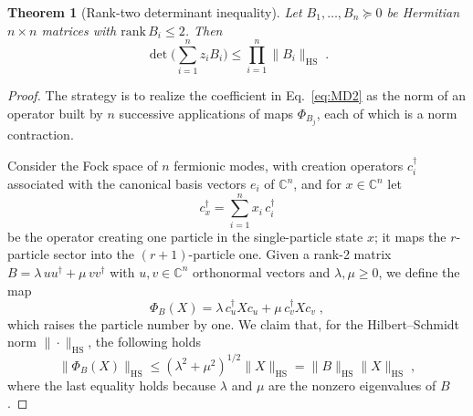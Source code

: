 \documentclass[prx,twocolumn,superscriptaddress,aps,10pt, frontmatterverbose, reprint,footinbib,longbibliography=true]{revtex4-2}
\newtheorem{theorem}{Theorem}
\begin{document}
\begin{theorem}[Rank-two determinant inequality]
\label{thm:MD2}
Let $B_1,\dots,B_n\succeq0$ be Hermitian $n\times n$ matrices with $\mathrm{rank}\,B_i\le2$. Then
\begin{equation}
    [z_1\cdots z_n]\det\!\Big(\sum_{i=1}^nz_iB_i\Big)\le\prod_{i=1}^n\|B_i\|_{\mathrm{HS}}\;.
    \label{eq:MD2}
\end{equation}
\end{theorem}

\begin{proof}
The strategy is to realize the coefficient in Eq.~\eqref{eq:MD2} as the norm of an operator built by $n$ successive applications of maps $\Phi_{B_j}$, each of which is a norm contraction.

Consider the Fock space of $n$ fermionic modes, with creation operators $c_i^\dagger$ associated with the canonical basis vectors $e_i$ of $\mathbb{C}^n$, and for $x\in\mathbb{C}^n$ let
\begin{equation}
  c_x^\dagger=\sum_{i=1}^n x_i\,c_i^\dagger
\end{equation} 
be the operator creating one particle in the single-particle state $x$; it maps the $r$-particle sector into the $(r+1)$-particle one. Given a rank-2 matrix $B=\lambda\,uu^\dagger+\mu\,vv^\dagger$ with $u,v \in \mathbb{C}^n$ orthonormal vectors and $\lambda,\mu\ge0$, we define the map
\begin{equation}
    \Phi_B(X)=\lambda\,c_u^\dagger Xc_u+\mu\,c_v^\dagger Xc_v\;,
\end{equation}
which raises the particle number by one.
We claim that, for the Hilbert--Schmidt norm $\|\cdot\|_{\mathrm{HS}}$, the following holds
\begin{equation}\|\Phi_B(X)\|_{\mathrm{HS}}\le(\lambda^2+\mu^2)^{1/2}\|X\|_{\mathrm{HS}}=\|B\|_{\mathrm{HS}}\|X\|_{\mathrm{HS}}\;,
    \label{eq:Phi-contraction}
\end{equation}
where the last equality holds because $\lambda$ and $\mu$ are the nonzero eigenvalues of $B$.


\end{proof}
\end{document}

